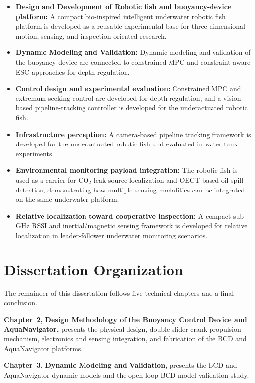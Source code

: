 \documentclass{uhcoethesis}
\begin{document}
\begin{itemize}
\item \textbf{Design and Development of Robotic fish and buoyancy-device platform:} A compact bio-inspired intelligent underwater robotic fish platform is developed as a reusable experimental base for three-dimensional motion, sensing, and inspection-oriented research.
\item \textbf{Dynamic Modeling and Validation:} Dynamic modeling and validation of the buoyancy device are connected to constrained MPC and constraint-aware ESC approaches for depth regulation.
\item \textbf{Control design and experimental evaluation:} Constrained MPC and extremum seeking control are developed for depth regulation, and a vision-based pipeline-tracking controller is developed for the underactuated robotic fish.
\item \textbf{Infrastructure perception:} A camera-based pipeline tracking framework is developed for the underactuated robotic fish and evaluated in water tank experiments.
\item \textbf{Environmental monitoring payload integration:} The robotic fish is used as a carrier for \mbox{CO$_2$} leak-source localization and OECT-based oil-spill detection, demonstrating how multiple sensing modalities can be integrated on the same underwater platform.
\item \textbf{Relative localization toward cooperative inspection:} A compact sub-GHz RSSI and inertial/magnetic sensing framework is developed for relative localization in leader-follower underwater monitoring scenarios.
\end{itemize}

\section{Dissertation Organization}

The remainder of this dissertation follows five technical chapters and a final conclusion.

\textbf{Chapter~2, Design Methodology of the Buoyancy Control Device and AquaNavigator,} presents the physical design, double-slider-crank propulsion mechanism, electronics and sensing integration, and fabrication of the BCD and AquaNavigator platforms.

\textbf{Chapter~3, Dynamic Modeling and Validation,} presents the BCD and AquaNavigator dynamic models and the open-loop BCD model-validation study.
\end{document}
